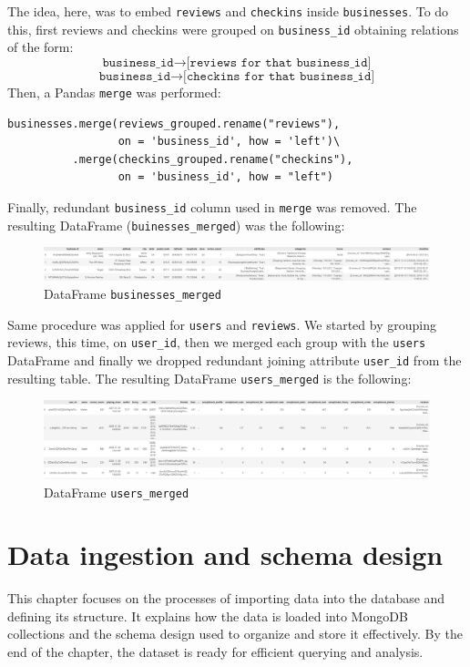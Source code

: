 \documentclass{Configuration_Files/PoliMi3i_thesis}
\begin{document}
The idea, here, was to embed \texttt{reviews} and \texttt{checkins} inside \texttt{businesses}. To do this, first reviews and checkins were grouped on \texttt{business\_id} obtaining relations of the form:
$$\texttt{business\_id} \longrightarrow \texttt{[reviews for that business\_id]}$$
$$\texttt{business\_id} \longrightarrow \texttt{[checkins for that business\_id]}$$
Then, a Pandas \texttt{merge} was performed:
\begin{verbatim}
businesses.merge(reviews_grouped.rename("reviews"), 
                 on = 'business_id', how = 'left')\
          .merge(checkins_grouped.rename("checkins"), 
                 on = 'business_id', how = "left")
\end{verbatim}

\bigskip

Finally, redundant \texttt{business\_id} column used in \texttt{merge} was removed. The resulting DataFrame (\texttt{buinesses\_merged}) was the following:
\begin{figure}[H]
    \centering
    \includegraphics[width=1.1\columnwidth]{imgs/businesses_merged.png}
    \caption{DataFrame \texttt{businesses\_merged}}
    \label{fig:businesses_merged}
\end{figure}

Same procedure was applied for \texttt{users} and \texttt{reviews}. We started by grouping reviews, this time, on \texttt{user\_id}, then we merged each group with the \texttt{users} DataFrame and finally we dropped redundant joining attribute \texttt{user\_id} from the resulting table. The resulting DataFrame \texttt{users\_merged} is the following:
\begin{figure}[H]
    \centering
    \includegraphics[width=1.1\columnwidth]{imgs/users_merged.png}
    \caption{DataFrame \texttt{users\_merged}}
    \label{fig:users_merged}
\end{figure}

\cleardoublepage

\chapter{Data ingestion and schema design}
This chapter focuses on the processes of importing data into the database and defining its structure. It explains how the data is loaded into MongoDB collections and the schema design used to organize and store it effectively. By the end of the chapter, the dataset is ready for efficient querying and analysis.
\end{document}
